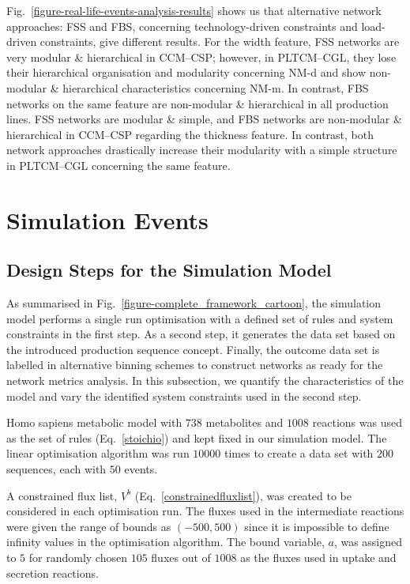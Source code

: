 Fig.~\ref{figure-real-life-events-analysis-results} shows us that alternative network approaches: FSS and FBS, concerning technology-driven constraints and load-driven constraints, give different results. For the width feature, FSS networks are very modular \& hierarchical in CCM--CSP; however, in PLTCM--CGL, they lose their hierarchical organisation and modularity concerning NM-d and show non-modular \& hierarchical characteristics concerning NM-m. In contrast, FBS networks on the same feature are non-modular \& hierarchical in all production lines. FSS networks are modular \& simple, and FBS networks are non-modular \& hierarchical in CCM--CSP regarding the thickness feature. In contrast, both network approaches drastically increase their modularity with a simple structure in PLTCM--CGL concerning the same feature.
\clearpage

\section{Simulation Events}
\subsection{Design Steps for the Simulation Model}

As summarised in Fig.~\ref{figure-complete_framework_cartoon}, the simulation model performs a single run optimisation with a defined set of rules and system constraints in the first step. As a second step, it generates the data set based on the introduced production sequence concept. Finally, the outcome data set is labelled in alternative binning schemes to construct networks as ready for the network metrics analysis. In this subsection, we quantify the characteristics of the model and vary the identified system constraints used in the second step.

Homo sapiens metabolic model with $738$ metabolites and $1008$ reactions was used as the set of rules (Eq.~\ref{stoichio}) and kept fixed in our simulation model. The linear optimisation algorithm was run $10000$ times to create a data set with $200$ sequences, each with $50$ events.

A constrained flux list, $V^{b}$ (Eq.~\ref{constrainedfluxlist}), was created to be considered in each optimisation run. The fluxes used in the intermediate reactions were given the range of bounds as $(-500, 500)$ since it is impossible to define infinity values in the optimisation algorithm. The bound variable, $a$, was assigned to $5$ for randomly chosen $105$ fluxes out of $1008$ as the fluxes used in uptake and secretion reactions.

